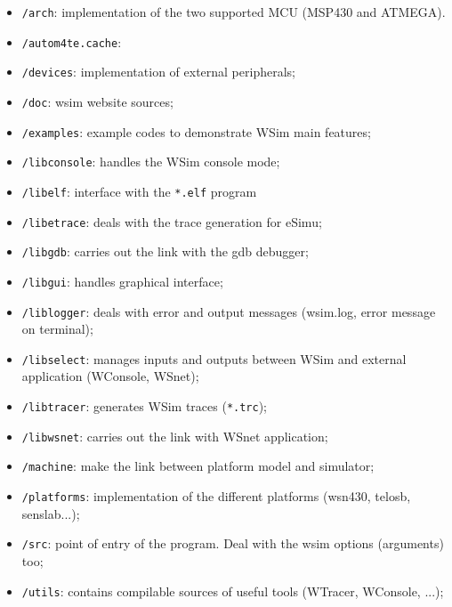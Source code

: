 \documentclass[a4paper,10pt]{report}
\begin{document}
\begin{itemize}
  \item \verb$/arch$: implementation of the two supported MCU (MSP430 and ATMEGA).

  \item \verb$/autom4te.cache$:

  \item \verb$/devices$: implementation of external peripherals;

  \item \verb$/doc$: wsim website sources;

  \item \verb$/examples$: example codes to demonstrate WSim main features;

  \item \verb$/libconsole$: handles the WSim console mode;

  \item \verb$/libelf$: interface with the \verb$*.elf$ program

  \item \verb$/libetrace$: deals with the trace generation for eSimu;

  \item \verb$/libgdb$: carries out the link with the gdb debugger;

  \item \verb$/libgui$: handles graphical interface;

  \item \verb$/liblogger$: deals with error and output messages (wsim.log, error message on terminal);

  \item \verb$/libselect$: manages inputs and outputs between WSim and external application (WConsole, WSnet);

  \item \verb$/libtracer$: generates WSim traces (\verb$*.trc$);

  \item \verb$/libwsnet$: carries out the link with WSnet application;

  \item \verb$/machine$: make the link between platform model and simulator;

  \item \verb$/platforms$: implementation of the different platforms (wsn430, telosb, senslab...);

  \item \verb$/src$: point of entry of the program. Deal with the wsim options (arguments) too;

  \item \verb$/utils$: contains compilable sources of useful tools (WTracer, WConsole, ...);
\end{itemize}
\end{document}
